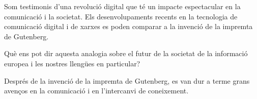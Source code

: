 \clearpage



\begin{multicols}{2}

Som testimonis d’una revolució digital que té un impacte espectacular en la comunicació i la societat. Els desenvolupaments recents en la tecnologia de comunicació digital i de xarxes es poden comparar a la invenció de la impremta de Gutenberg.


Què ens pot dir aquesta analogia sobre el futur de la societat de la informació europea i les nostres llengües en particular?

Després de la invenció de la impremta de Gutenberg, es van dur a terme grans avenços en la comunicació i en l’intercanvi de coneixement.


\end{multicols}
